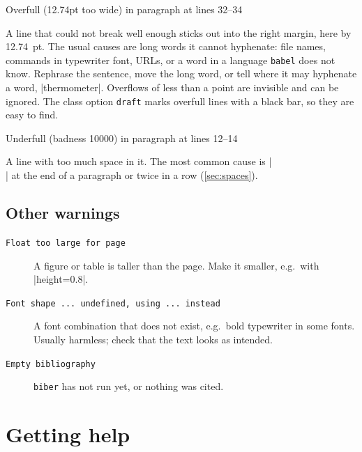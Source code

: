 \begin{codeblock}[style=shell]
Overfull \hbox (12.74pt too wide) in paragraph at lines 32--34
\end{codeblock}

A line that  could not break well enough sticks out into the right margin, here by \qty{12.74}{pt}.
The usual causes are long words it cannot hyphenate:
file names, commands in typewriter font, URLs, or a word in a language \texttt{babel} does not know.
Rephrase the sentence, move the long word,
or tell  where it may hyphenate a word, \code|ther\-mo\-me\-ter|.
Overflows of less than a point are invisible and can be ignored.
The class option \texttt{draft} marks overfull lines with a black bar, so they are easy to find.

\begin{codeblock}[style=shell]
Underfull \hbox (badness 10000) in paragraph at lines 12--14
\end{codeblock}

A line with too much space in it.
The most common cause is \code|\\| at the end of a paragraph or twice in a row (\autoref{sec:spaces}).

\subsection{Other warnings}

\begin{description}
    \item[\texttt{Float too large for page}]
        A figure or table is taller than the page.
        Make it smaller, e.g.\ with \code|height=0.8\textheight|.
    \item[\texttt{Font shape ... undefined, using ... instead}]
        A font combination that does not exist, e.g.\ bold typewriter in some fonts.
        Usually harmless; check that the text looks as intended.
    \item[\texttt{Empty bibliography}]
        \texttt{biber} has not run yet, or nothing was cited.
\end{description}

\section{Getting help}\label{sec:help}

